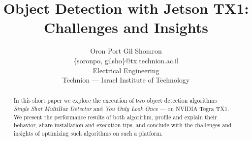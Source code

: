 \documentclass{sig-alternate}
\title{Object Detection with Jetson TX1:\\Challenges and Insights}
\author{
  {
  Oron Port\hspace{10 mm}
  Gil Shomron}\\[0mm]
  \{soronpo, gilsho\}@tx.technion.ac.il\\[0mm]
  Electrical Engineering\\[0mm]
  Technion --- Israel Institute of Technology
}
\begin{document}
\maketitle
\thispagestyle{firstpage}
\pagestyle{plain}




\begin{abstract}

In this short paper we explore the execution of two object detection algorithms --- \textit{Single Shot MultiBox Detector} and \textit{You Only Look Once} --- on NVIDIA Tegra TX1. We present the performance results of both algorithm, profile and explain their behavior, share installation and execution tips, and conclude with the challenges and insights of optimizing such algorithms on such a platform.

\end{abstract}














\end{document}
